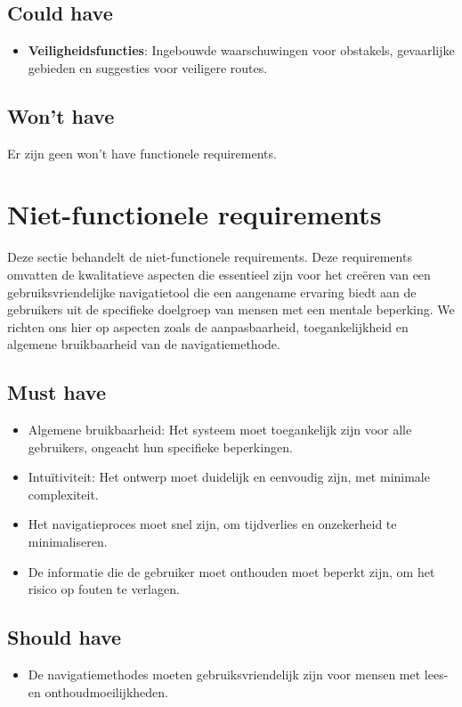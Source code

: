 \subsection*{Could have}
\begin{itemize}
    \item \textbf{Veiligheidsfuncties}: Ingebouwde waarschuwingen voor obstakels, gevaarlijke gebieden en suggesties voor veiligere routes.
\end{itemize}

\subsection*{Won't have}
Er zijn geen won't have functionele requirements.


\section{Niet-functionele requirements}
\label{sec:niet-functionele-requirements}

Deze sectie behandelt de niet-functionele requirements. Deze requirements omvatten de kwalitatieve aspecten die essentieel zijn voor het creëren van een gebruiksvriendelijke navigatietool die een aangename ervaring biedt aan de gebruikers uit de specifieke doelgroep van mensen met een mentale beperking. We richten ons hier op aspecten zoals de aanpasbaarheid, toegankelijkheid en algemene bruikbaarheid van de navigatiemethode.

\subsection*{Must have}
\begin{itemize}
    \item {Algemene bruikbaarheid}: Het systeem moet toegankelijk zijn voor alle gebruikers, ongeacht hun specifieke beperkingen.
    \item {Intuïtiviteit}: Het ontwerp moet duidelijk en eenvoudig zijn, met minimale complexiteit.
    \item Het navigatieproces moet snel zijn, om tijdverlies en onzekerheid te minimaliseren.
    \item De informatie die de gebruiker moet onthouden moet beperkt zijn, om het risico op fouten te verlagen.
\end{itemize}

\subsection*{Should have}
\begin{itemize}
    \item De navigatiemethodes moeten gebruiksvriendelijk zijn voor mensen met lees- en onthoudmoeilijkheden.
\end{itemize}

